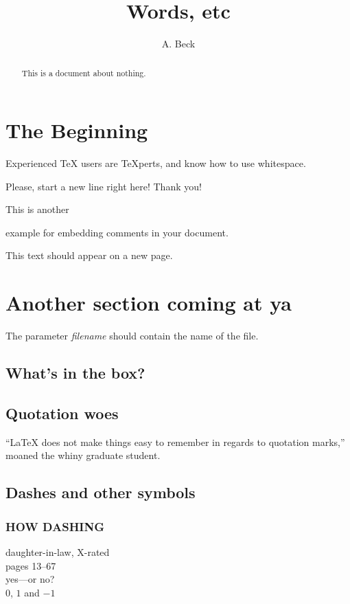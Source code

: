 \documentclass[11pt]{article}
\author{A. Beck}
\title{Words, etc}
\begin{document}
\maketitle

\begin{abstract}
This is a document about nothing.
\end{abstract}

\tableofcontents

\section{The Beginning}
Experienced \TeX{} users are \TeX perts, and know how to use whitespace. %

Please, start a new line right here!\newline
Thank you!

This is another
\begin{comment}
rather stupid,
but helpful
\end{comment}
example for embedding
comments in your document.

\newpage
This text should appear on a new page.

\section{Another section coming at ya}
The parameter \mbox{\emph{filename}} should contain the name of the file. %

\subsection{What's in the box?}
\label{box}

\subsection{Quotation woes}
``\LaTeX{} does not make things easy to remember in regards to quotation marks,'' moaned the whiny graduate student.

\subsection{Dashes and other symbols}
\subsubsection{HOW DASHING}
daughter-in-law, X-rated\\ %
pages 13--67\\ %
yes---or no? \\ %
$0$, $1$ and $-1$ %
\end{document}
